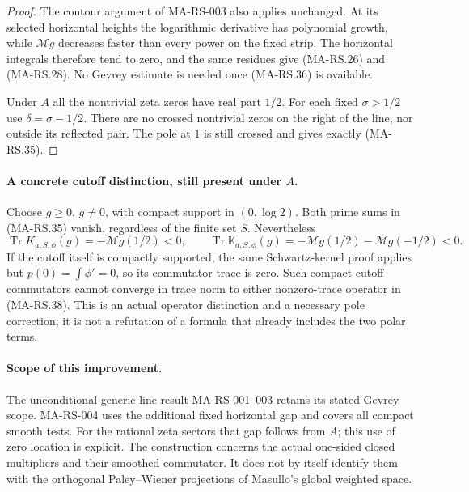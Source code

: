 \begin{proof}
The contour argument of MA-RS-003 also applies unchanged.
At its selected horizontal heights the logarithmic derivative
has polynomial growth, while $\mathcal Mg$ decreases faster
than every power on the fixed strip. The horizontal integrals
therefore tend to zero, and the same residues give
(MA-RS.26) and (MA-RS.28). No Gevrey estimate is needed once
(MA-RS.36) is available.

Under $A$ all the nontrivial zeta zeros have real part $1/2$.
For each fixed $\sigma>1/2$ use $\delta=\sigma-1/2$.
There are no crossed nontrivial zeros on the right of the
line, nor outside its reflected pair. The pole at $1$
is still crossed and gives exactly (MA-RS.35).
\end{proof}

\paragraph{A concrete cutoff distinction, still present under $A$.}
Choose $g\ge0$, $g\ne0$, with compact support in
$(0,\log2)$. Both prime sums in (MA-RS.35) vanish,
regardless of the finite set $S$. Nevertheless
\[
 \operatorname{Tr}K_{a,S,\phi}(g)=-\mathcal Mg(1/2)<0,
 \qquad
 \operatorname{Tr}\mathbb K_{a,S,\phi}(g)
        =-\mathcal Mg(1/2)-\mathcal Mg(-1/2)<0.
 \tag{MA-RS.38}
\]
If the cutoff itself is compactly supported, the same
Schwartz-kernel proof applies but $p(0)=\int\phi'=0$,
so its commutator trace is zero. Such compact-cutoff
commutators cannot converge in trace norm to either
nonzero-trace operator in (MA-RS.38). This is an actual
operator distinction and a necessary pole correction;
it is not a refutation of a formula that already includes
the two polar terms.

\paragraph{Scope of this improvement.}
The unconditional generic-line result MA-RS-001--003 retains
its stated Gevrey scope. MA-RS-004 uses the additional fixed
horizontal gap and covers all compact smooth tests. For the
rational zeta sectors that gap follows from $A$; this use of
zero location is explicit. The construction concerns the actual
one-sided closed multipliers and their smoothed commutator.
It does not by itself identify them with the orthogonal
Paley--Wiener projections of Masullo's global weighted space.
